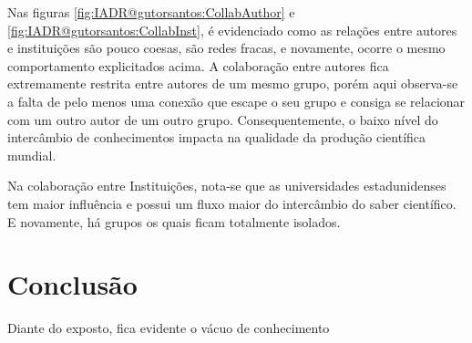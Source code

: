Nas figuras \ref{fig:IADR@gutorsantos:CollabAuthor} e \ref{fig:IADR@gutorsantos:CollabInst}, é evidenciado como as relações entre autores e instituições são pouco coesas, são redes fracas, e novamente, ocorre o mesmo comportamento explicitados acima. A colaboração entre autores fica extremamente restrita entre autores de um mesmo grupo, porém aqui observa-se a falta de pelo menos uma conexão que escape o seu grupo e consiga se relacionar com um outro autor de um outro grupo. Consequentemente, o baixo nível do intercâmbio de conhecimentos impacta na qualidade da produção científica mundial. 


Na colaboração entre Instituições, nota-se que as universidades estadunidenses tem maior influência e possui um fluxo maior do intercâmbio do saber científico. E novamente, há grupos os quais ficam totalmente isolados. 

\section{Conclusão}

Diante do exposto, fica evidente o vácuo de conhecimento